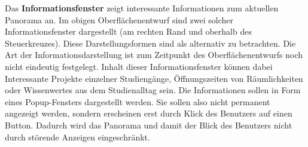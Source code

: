 Das \textbf{Informationsfenster} zeigt interessante Informationen zum aktuellen Panorama an. Im obigen Oberflächenentwurf sind zwei solcher Informationsfenster dargestellt (am rechten Rand und oberhalb des Steuerkreuzes). Diese Darstellungsformen sind als alternativ zu betrachten. Die Art der Informationsdarstellung ist zum Zeitpunkt des Oberflächenentwurfs noch nicht eindeutig festgelegt. Inhalt dieser Informationsfenster können dabei Interessante Projekte einzelner Studiengänge, Öffnungszeiten von Räumlichkeiten oder Wissenwertes aus dem Studienalltag sein. Die Informationen sollen in Form eines Popup-Fensters dargestellt werden.
Sie sollen also nicht permanent angezeigt werden, sondern erscheinen erst durch Klick des Benutzers auf einen Button. Dadurch wird das Panorama und damit der Blick des Benutzers nicht durch störende Anzeigen eingeschränkt.

\clearpage